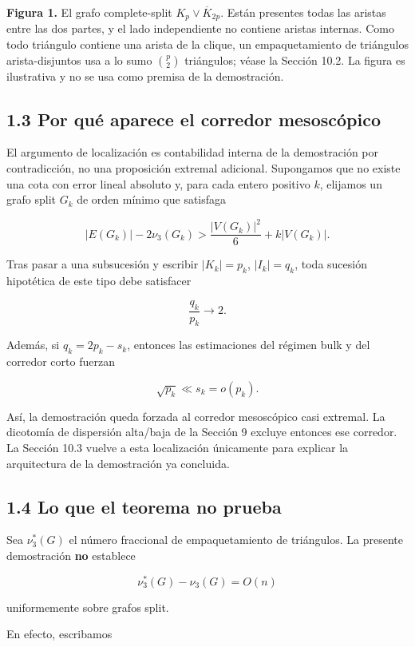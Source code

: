 \documentclass[
  spanish,
  11pt,
  a4paper,
]{article}
\begin{document}
\textbf{Figura 1.} El grafo complete-split \(K_p\vee\overline K_{2p}\). Están presentes todas las aristas entre las dos partes, y el lado independiente no contiene aristas internas. Como todo triángulo contiene una arista de la clique, un empaquetamiento de triángulos arista-disjuntos usa a lo sumo \(\binom p2\) triángulos; véase la Sección 10.2. La figura es ilustrativa y no se usa como premisa de la demostración.

\subsection{1.3 Por qué aparece el corredor mesoscópico}\label{por-quuxe9-aparece-el-corredor-mesoscuxf3pico}

El argumento de localización es contabilidad interna de la demostración por contradicción, no una proposición extremal adicional. Supongamos que no existe una cota con error lineal absoluto y, para cada entero positivo \(k\), elijamos un grafo split \(G_k\) de orden mínimo que satisfaga

\[
|E(G_k)|-2\nu_3(G_k)>\frac{|V(G_k)|^2}{6}+k|V(G_k)|.
\]

Tras pasar a una subsucesión y escribir \(|K_k|=p_k\), \(|I_k|=q_k\), toda sucesión hipotética de este tipo debe satisfacer

\[
\frac{q_k}{p_k}\longrightarrow 2.
\]

Además, si \(q_k=2p_k-s_k\), entonces las estimaciones del régimen bulk y del corredor corto fuerzan

\[
\sqrt{p_k}\ll s_k=o(p_k).
\]

Así, la demostración queda forzada al corredor mesoscópico casi extremal. La dicotomía de dispersión alta/baja de la Sección 9 excluye entonces ese corredor. La Sección 10.3 vuelve a esta localización únicamente para explicar la arquitectura de la demostración ya concluida.

\subsection{1.4 Lo que el teorema no prueba}\label{lo-que-el-teorema-no-prueba}

Sea \(\nu_3^*(G)\) el número fraccional de empaquetamiento de triángulos. La presente demostración \textbf{no} establece

\[
\nu_3^*(G)-\nu_3(G)=O(n)
\tag{1.4}
\]

uniformemente sobre grafos split.

En efecto, escribamos
\end{document}
